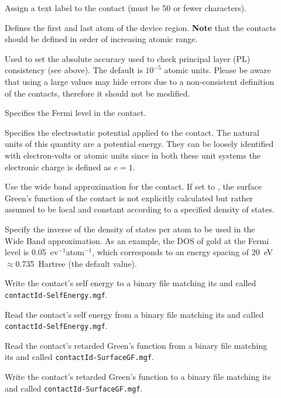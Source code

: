 \begin{description}
\item[] Assign a text label to the contact (must be 50 or fewer
  characters).
\item[] \label{AtomRange} Defines the first and last atom of the
  device region.  {\bf Note} that the contacts should be defined in order of
  increasing atomic range.
\item[] Used to set the absolute
  accuracy used to check principal layer (PL) consistency (see above). The
  default is $10^{-5}$ atomic units. Please be aware that using a large values
  may hide errors due to a non-consistent definition of the contacts, therefore
  it should not be modified.
\item[] Specifies the Fermi level in the
  contact.
\item[] Specifies the electrostatic
  potential applied to the contact. The natural units of this quantity are a
  potential energy. They can be loosely identified with electron-volts or atomic
  units since in both these unit systems the electronic charge is defined as
  $e=1$.
\item[] Use the wide band approximation for the contact. If set to
  , the surface Green's function of the contact is not explicitly
  calculated but rather assumed to be local and constant according to a
  specified density of states.
\item[] Specify the inverse of the
  density of states per atom to be used in the Wide Band approximation. As an
  example, the DOS of gold at the Fermi level is 0.05~ev$^{-1}$atom$^{-1}$,
  which corresponds to an energy spacing of 20~eV $\approx$0.735~Hartree (the
  default value).
\item[] Write the contact's self energy to a binary file
  matching its  and called \verb|contactId-SelfEnergy.mgf|.
\item[] Read the contact's self energy from a binary file
  matching its  and called \verb|contactId-SelfEnergy.mgf|.
\item[] Read the contact's retarded Green's function from a
  binary file matching its  and called
  \verb|contactId-SurfaceGF.mgf|.
\item[] Write the contact's retarded Green's function to a
  binary file matching its  and called
  \verb|contactId-SurfaceGF.mgf|.
\end{description}

